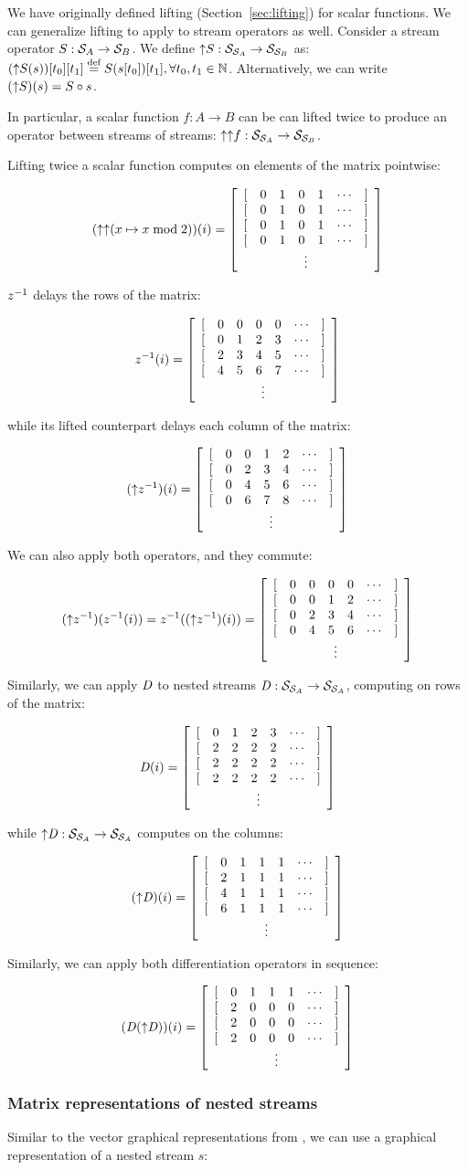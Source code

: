 We have originally defined lifting (Section~\ref{sec:lifting}) for scalar functions.
We can generalize lifting to apply to stream operators as well.  Consider a
stream operator $S: \mathcal{S}_{A} \to \mathcal{S}_{B}$.  We define ${\uparrow}S: \mathcal{S}_{\mathcal{S}_{A}}
\to \mathcal{S}_{\mathcal{S}_{B}}$ as: $({\uparrow}S(s))[t_0][t_1] \stackrel{\textrm{\scriptsize def}}{=} S(s[t_0])[t_1], \forall t_0, t_1 \in
\mathbb{N}$.  Alternatively, we can write $({\uparrow}S)(s) = S \circ s$.

In particular, a scalar function $f: A \rightarrow B$ can be can lifted twice to
produce an operator between streams of streams: ${\uparrow}{\uparrow}f: \mathcal{S}_{\mathcal{S}_{A}}
\rightarrow \mathcal{S}_{\mathcal{S}_{B}}$.

Lifting twice a scalar function computes on elements of the matrix pointwise:

$$(\lift{\lift{(x \mapsto x \bmod 2)}})(i) =
  \ssa{0 1 0 1 0 1 0 1 0 1 0 1 0 1 0 1}
$$

$z^{-1}$ delays the rows of the matrix:

$$\zm(i) = \ssa{0 0 0 0 0 1 2 3 2 3 4 5 4 5 6 7}$$

\noindent while its lifted counterpart delays each column of the matrix:

$$(\lift{\zm})(i) = \ssa{0 0 1 2 0 2 3 4 0 4 5 6 0 6 7 8}$$

We can also apply both operators, and they commute:

$$(\lift{\zm})(\zm(i)) = \zm((\lift{\zm})(i)) = \ssa{0 0 0 0 0 0 1 2 0 2 3 4 0 4 5 6}$$

Similarly, we can apply $\mathit{D}$ to nested streams $\mathit{D} : \mathcal{S}_{\mathcal{S}_{A}} \to
\mathcal{S}_{\mathcal{S}_{A}}$, computing on rows of the matrix:

$$\D(i) = \ssa{0 1 2 3 2 2 2 2 2 2 2 2 2 2 2 2}$$

\noindent while ${\uparrow}\mathit{D} : \mathcal{S}_{\mathcal{S}_{A}} \to \mathcal{S}_{\mathcal{S}_{A}}$
computes on the columns:

$$(\lift{\D})(i) = \ssa{0 1 1 1 2 1 1 1 4 1 1 1 6 1 1 1}$$

Similarly, we can apply both differentiation operators in sequence:

$$(\D(\lift{\D}))(i) = \ssa{0 1 1 1 2 0 0 0 2 0 0 0 2 0 0 0}$$

\subsubsection{Matrix representations of nested streams}\label{sec:matrix-picture}

Similar to the vector graphical representations from ,
we can use a graphical representation of a nested stream $s$:

